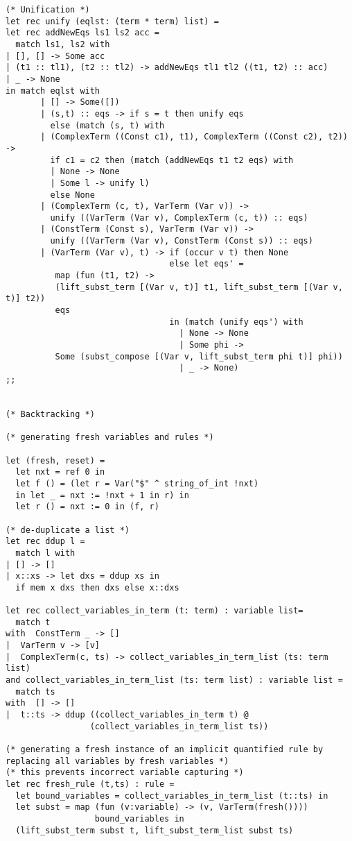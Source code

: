 \documentclass{article}
\begin{document}
\begin{verbatim}
(* Unification *)
let rec unify (eqlst: (term * term) list) =
let rec addNewEqs ls1 ls2 acc =
  match ls1, ls2 with
| [], [] -> Some acc
| (t1 :: tl1), (t2 :: tl2) -> addNewEqs tl1 tl2 ((t1, t2) :: acc)
| _ -> None
in match eqlst with
       | [] -> Some([])
       | (s,t) :: eqs -> if s = t then unify eqs
         else (match (s, t) with 
       | (ComplexTerm ((Const c1), t1), ComplexTerm ((Const c2), t2)) ->
         if c1 = c2 then (match (addNewEqs t1 t2 eqs) with 
         | None -> None 
         | Some l -> unify l)
         else None
       | (ComplexTerm (c, t), VarTerm (Var v)) -> 
         unify ((VarTerm (Var v), ComplexTerm (c, t)) :: eqs)
       | (ConstTerm (Const s), VarTerm (Var v)) -> 
         unify ((VarTerm (Var v), ConstTerm (Const s)) :: eqs)
       | (VarTerm (Var v), t) -> if (occur v t) then None
                                 else let eqs' = 
          map (fun (t1, t2) -> 
          (lift_subst_term [(Var v, t)] t1, lift_subst_term [(Var v, t)] t2))
          eqs
                                 in (match (unify eqs') with 
                                   | None -> None 
                                   | Some phi -> 
          Some (subst_compose [(Var v, lift_subst_term phi t)] phi))
                                   | _ -> None)
;;


(* Backtracking *)

(* generating fresh variables and rules *)

let (fresh, reset) = 
  let nxt = ref 0 in
  let f () = (let r = Var("$" ^ string_of_int !nxt) 
  in let _ = nxt := !nxt + 1 in r) in
  let r () = nxt := 0 in (f, r)

(* de-duplicate a list *)
let rec ddup l =
  match l with
| [] -> []
| x::xs -> let dxs = ddup xs in
  if mem x dxs then dxs else x::dxs

let rec collect_variables_in_term (t: term) : variable list=
  match t
with  ConstTerm _ -> []
|  VarTerm v -> [v]
|  ComplexTerm(c, ts) -> collect_variables_in_term_list (ts: term list)
and collect_variables_in_term_list (ts: term list) : variable list =
  match ts
with  [] -> []
|  t::ts -> ddup ((collect_variables_in_term t) @
                 (collect_variables_in_term_list ts))

(* generating a fresh instance of an implicit quantified rule by
replacing all variables by fresh variables *)
(* this prevents incorrect variable capturing *)
let rec fresh_rule (t,ts) : rule =
  let bound_variables = collect_variables_in_term_list (t::ts) in
  let subst = map (fun (v:variable) -> (v, VarTerm(fresh()))) 
                  bound_variables in
  (lift_subst_term subst t, lift_subst_term_list subst ts)



\end{verbatim}
\end{document}
